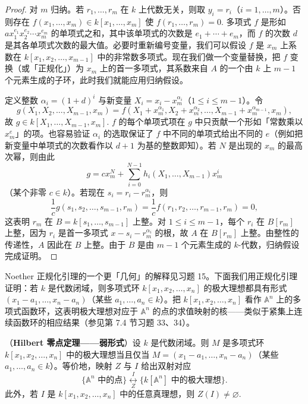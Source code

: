 \begin{proof}
对 \(m\) 归纳。若 \(r_1, \ldots, r_m\) 在 \(k\) 上代数无关，则取 \(y_i = r_i\)（\(i = 1, \ldots, m\)）。否则存在 \(f(x_1, \ldots, x_m) \in k[x_1, \ldots, x_m]\) 使 \(f(r_1, \ldots, r_m) = 0\). 多项式 \(f\) 是形如 \(ax_1^{e_1}x_2^{e_2}\cdots x_m^{e_m}\) 的单项式之和，其中该单项式的次数是 \(e_1+\cdots+e_m\)，而 \(f\) 的次数 \(d\) 是其各单项式次数的最大值。必要时重新编号变量，我们可以假设 \(f\) 是 \(x_m\) 上系数在 \(k[x_1, x_2, \ldots, x_{m-1}]\) 中的非常数多项式。现在我们做一个变量替换，把 \(f\) 变换（或「正规化」）为 \(x_m\) 上的首一多项式，其系数来自 \(A\) 的一个由 \(k\) 上 \(m-1\) 个元素生成的子环，此时我们就能应用归纳假设。

定义整数 \(\alpha_i = (1+d)^i\) 与新变量 \(X_i = x_i-x_m^{\alpha_i}\)（\(1 \leq i \leq m-1\)）。令
\[
g(X_1, X_2, \ldots, X_{m-1}, x_m) = f(X_1+x_m^{\alpha_1}, X_2+x_m^{\alpha_2}, \ldots, X_{m-1}+x_m^{\alpha_{m-1}}, x_m),
\]
故 \(g \in k[X_1, \ldots, X_{m-1}, x_m]\). \(f\) 的每个单项式项在 \(g\) 中只贡献一个形如「常数乘以 \(x_m^e\)」的项。也容易验证 \(\alpha_i\) 的选取保证了 \(f\) 中不同的单项式给出不同的 \(e\)（例如把新变量中单项式的次数看作以 \(d+1\) 为基的整数即知）。若 \(N\) 是出现的 \(x_m\) 的最高次幂，则由此
\[
g = cx_m^N+\sum_{i=0}^{N-1}h_i(X_1, \ldots, X_{m-1})x_m^i
\]
（某个非零 \(c \in k\)）。若现在 \(s_i = r_i-r_m^{\alpha_i}\)，则
\[
\frac{1}{c}g(s_1, s_2, \ldots, s_{m-1}, r_m) = \frac{1}{c}f(r_1, r_2, \ldots, r_{m-1}, r_m) = 0,
\]
这表明 \(r_m\) 在 \(B = k[s_1, \ldots, s_{m-1}]\) 上整。对 \(1 \leq i \leq m-1\)，每个 \(r_i\) 在 \(B[r_m]\) 上整，因为 \(r_i\) 是首一多项式 \(x-s_i-r_m^{\alpha_i}\) 的根，故 \(A\) 在 \(B[r_m]\) 上整。由整性的传递性，\(A\) 因此在 \(B\) 上整。由于 \(B\) 是由 \(m-1\) 个元素生成的 \(k\)-代数，归纳假设完成证明。
\end{proof}

Noether 正规化引理的一个更「几何」的解释见习题 15。下面我们用正规化引理证明：若 \(k\) 是代数闭域，则多项式环 \(k[x_1, x_2, \ldots, x_n]\) 的极大理想都具有形式 \((x_1-a_1, \ldots, x_n-a_n)\)（某些 \(a_1, \ldots, a_n \in k\)）。把 \(k[x_1, x_2, \ldots, x_n]\) 看作 \(\mathbb{A}^n\) 上的多项式函数环，这表明极大理想对应于 \(\mathbb{A}^n\) 的点的求值映射的核——类似于紧集上连续函数环的相应结果（参见第 7.4 节习题 33、34）。

\begin{theorem}\label{thm:15.31}
（\textbf{Hilbert 零点定理——弱形式}）设 \(k\) 是代数闭域。则 \(M\) 是多项式环 \(k[x_1, x_2, \ldots, x_n]\) 中的极大理想当且仅当 \(M = (x_1-a_1, \ldots, x_n-a_n)\)（某些 \(a_1, \ldots, a_n \in k\)）。等价地，映射 \(Z\) 与 \(I\) 给出双射对应
\[
\{\mathbb{A}^n \text{ 中的点}\} \underset{Z}{\overset{I}{\longleftrightarrow}} \{k[\mathbb{A}^n] \text{ 中的极大理想}\}.
\]
此外，若 \(I\) 是 \(k[x_1, x_2, \ldots, x_n]\) 中的任意真理想，则 \(Z(I) \neq \varnothing\).
\end{theorem}

